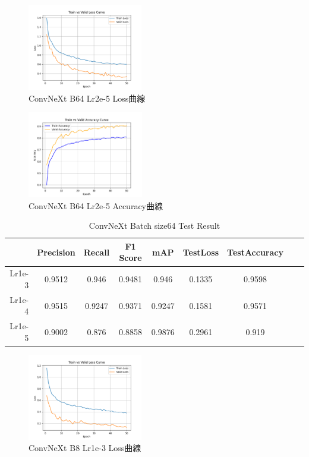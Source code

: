 \begin{figure}[htbp]
    \centering
    \includegraphics[width=0.45\textwidth]{./img/ConvNeXt/P3.png}
    \caption{ConvNeXt B64 Lr2e-5 Loss曲線}
    \label{fig:ConvNeXt_P3}
\end{figure}
\begin{figure}[htbp]
    \centering
    \includegraphics[width=0.45\textwidth]{./img/ConvNeXt/P4.png}
    \caption{ConvNeXt B64 Lr2e-5 Accuracy曲線}
    \label{fig:ConvNeXt_P4}
\end{figure}
\begin{table}
    \centering
    \caption{ConvNeXt Batch size64 Test Result}
    \begin{tabular}{|r|c|c|c|c|c|c|c|c|}
        \hline
        & Precision & Recall & F1 Score & mAP & TestLoss & TestAccuracy \\
        \hline
        Lr1e-3 & 0.9512 & 0.946 & 0.9481 & 0.946 & 0.1335 & 0.9598 \\
        \hline
        Lr1e-4 & 0.9515 & 0.9247 & 0.9371 & 0.9247 & 0.1581 & 0.9571 \\
        \hline
        Lr1e-5 & 0.9002 & 0.876 & 0.8858 & 0.9876 & 0.2961 & 0.919 \\
        \hline
    \end{tabular}
    \label{table:ConvNeXt_T1}
\end{table}
\begin{figure}[htbp]
    \centering
    \includegraphics[width=0.45\textwidth]{./img/ConvNeXt/P5.png}
    \caption{ConvNeXt B8 Lr1e-3 Loss曲線}
    \label{fig:ConvNeXt_P5}
\end{figure}
